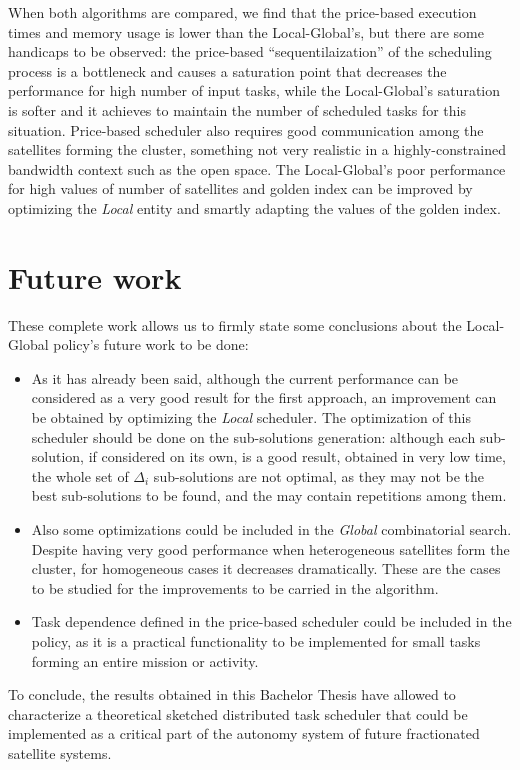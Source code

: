 When both algorithms are compared, we find that the price-based execution times and memory usage is lower than the Local-Global's, but there are some handicaps to be observed: the price-based ``sequentilaization'' of the scheduling process is a bottleneck and causes a saturation point that decreases the performance for high number of input tasks, while the Local-Global's saturation is softer and it achieves to maintain the number of scheduled tasks for this situation. Price-based scheduler also requires good communication among the satellites forming the cluster, something not very realistic in a highly-constrained bandwidth context such as the open space. The Local-Global's poor performance for high values of number of satellites and golden index can be improved by optimizing the \emph{Local} entity and smartly adapting the values of the golden index.

\section{Future work}

These complete work allows us to firmly state some conclusions about the Local-Global policy's future work to be done:
\begin{itemize}
\item As it has already been said, although the current performance can be considered as a very good result for the first approach, an improvement can be obtained by optimizing the \emph{Local} scheduler. The optimization of this scheduler should be done on the sub-solutions generation: although each sub-solution, if considered on its own, is a good result, obtained in very low time, the whole set of $\Delta_i$ sub-solutions are not optimal, as they may not be the best sub-solutions to be found, and the may contain repetitions among them.
\item Also some optimizations could be included in the \emph{Global} combinatorial search. Despite having very good performance when heterogeneous satellites form the cluster, for homogeneous cases it decreases dramatically. These are the cases to be studied for the improvements to be carried in the algorithm.
\item Task dependence defined in the price-based scheduler could be included in the policy, as it is a practical functionality to be implemented for small tasks forming an entire mission or activity.
\end{itemize}

To conclude, the results obtained in this Bachelor Thesis have allowed to characterize a theoretical sketched distributed task scheduler that could be implemented as a critical part of the autonomy system of future fractionated satellite systems.